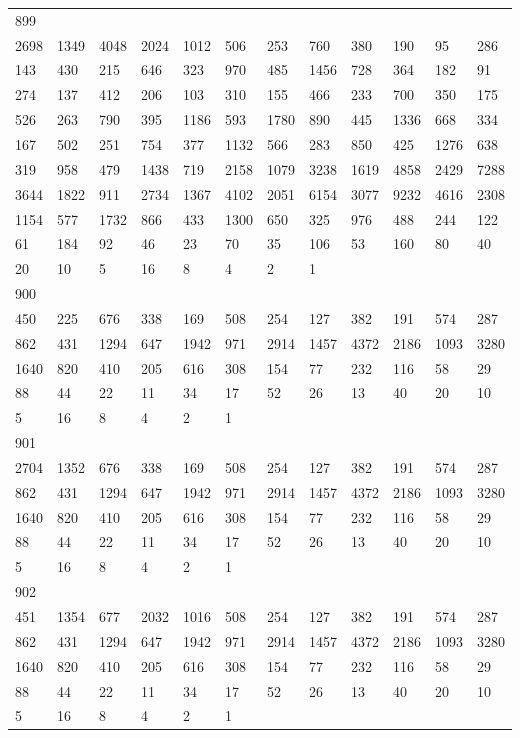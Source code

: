 \begin{longtable}{llllllllllll}
899&&&&&&&&&&&\\
2698& 1349& 4048& 2024& 1012& 506& 253& 760& 380& 190& 95& 286\\
143& 430& 215& 646& 323& 970& 485& 1456& 728& 364& 182& 91\\
274& 137& 412& 206& 103& 310& 155& 466& 233& 700& 350& 175\\
526& 263& 790& 395& 1186& 593& 1780& 890& 445& 1336& 668& 334\\
167& 502& 251& 754& 377& 1132& 566& 283& 850& 425& 1276& 638\\
319& 958& 479& 1438& 719& 2158& 1079& 3238& 1619& 4858& 2429& 7288\\
3644& 1822& 911& 2734& 1367& 4102& 2051& 6154& 3077& 9232& 4616& 2308\\
1154& 577& 1732& 866& 433& 1300& 650& 325& 976& 488& 244& 122\\
61& 184& 92& 46& 23& 70& 35& 106& 53& 160& 80& 40\\
20& 10& 5& 16& 8& 4& 2& 1& \\

900&&&&&&&&&&&\\
450& 225& 676& 338& 169& 508& 254& 127& 382& 191& 574& 287\\
862& 431& 1294& 647& 1942& 971& 2914& 1457& 4372& 2186& 1093& 3280\\
1640& 820& 410& 205& 616& 308& 154& 77& 232& 116& 58& 29\\
88& 44& 22& 11& 34& 17& 52& 26& 13& 40& 20& 10\\
5& 16& 8& 4& 2& 1& \\

901&&&&&&&&&&&\\
2704& 1352& 676& 338& 169& 508& 254& 127& 382& 191& 574& 287\\
862& 431& 1294& 647& 1942& 971& 2914& 1457& 4372& 2186& 1093& 3280\\
1640& 820& 410& 205& 616& 308& 154& 77& 232& 116& 58& 29\\
88& 44& 22& 11& 34& 17& 52& 26& 13& 40& 20& 10\\
5& 16& 8& 4& 2& 1& \\

902&&&&&&&&&&&\\
451& 1354& 677& 2032& 1016& 508& 254& 127& 382& 191& 574& 287\\
862& 431& 1294& 647& 1942& 971& 2914& 1457& 4372& 2186& 1093& 3280\\
1640& 820& 410& 205& 616& 308& 154& 77& 232& 116& 58& 29\\
88& 44& 22& 11& 34& 17& 52& 26& 13& 40& 20& 10\\
5& 16& 8& 4& 2& 1& \\


\end{longtable}
